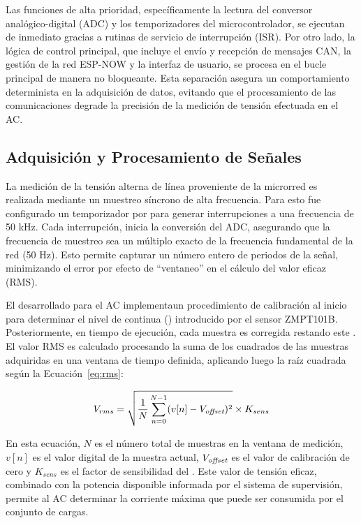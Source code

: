 Las funciones de alta prioridad, específicamente la lectura del conversor analógico-digital (ADC) y los temporizadores del microcontrolador, se ejecutan de inmediato gracias a rutinas de servicio de interrupción (ISR). Por otro lado, la lógica de control principal, que incluye el envío y recepción de mensajes CAN, la gestión de la red ESP-NOW y la interfaz de usuario, se procesa en el bucle principal de manera no bloqueante. Esta separación asegura un comportamiento determinista en la adquisición de datos, evitando que el procesamiento de las comunicaciones degrade la precisión de la medición de tensión efectuada en el AC.

\subsection{Adquisición y Procesamiento de Señales}

La medición de la tensión alterna de línea proveniente de la microrred es realizada mediante un muestreo síncrono de alta frecuencia. Para esto fue configurado un temporizador por  para generar interrupciones a una frecuencia de 50 kHz. Cada interrupción, inicia la conversión del ADC, asegurando que la frecuencia de muestreo sea un múltiplo exacto de la frecuencia fundamental de la red (50 Hz). Esto permite capturar un número entero de periodos de la señal, minimizando el error por efecto de ``ventaneo'' en el cálculo del valor eficaz (RMS).

El  desarrollado para el AC implementaun procedimiento de calibración al inicio para determinar el nivel de continua () introducido por el sensor ZMPT101B. Posteriormente, en tiempo de ejecución, cada muestra es corregida restando este . El valor RMS es calculado procesando la suma de los cuadrados de las muestras adquiridas en una ventana de tiempo definida, aplicando luego la raíz cuadrada según la Ecuación~\ref{eq:rms}:

\begin{equation}
    V_{rms} = \sqrt{\frac{1}{N} \sum_{n=0}^{N-1} (v[n] - V_{\textit{offset}})^2} \times K_{sens}
    \label{eq:rms}
\end{equation}

En esta ecuación, $N$ es el número total de muestras en la ventana de medición, $v[n]$ es el valor digital de la muestra actual, $V_{\textit{offset}}$ es el valor de calibración de cero y $K_{sens}$ es el factor de sensibilidad del . Este valor de tensión eficaz, combinado con la potencia disponible informada por el sistema de supervisión, permite al AC determinar la corriente máxima que puede ser consumida por el conjunto de cargas.


